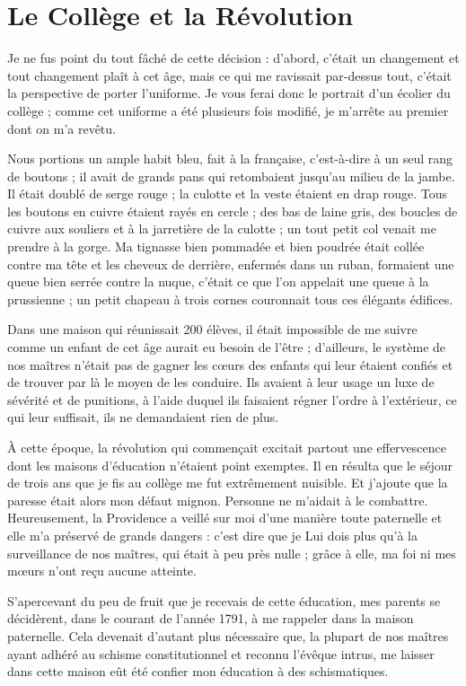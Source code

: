 \documentclass[11pt,a4paper]{report}
\begin{document}
\section*{Le Collège et la Révolution}

Je ne fus point du tout fâché de cette décision : d'abord, c'était un changement et tout changement plaît à cet âge, mais ce qui me ravissait par-dessus tout, c'était la perspective de porter l'uniforme. Je vous ferai donc le portrait d'un écolier du collège ; comme cet uniforme a été plusieurs fois modifié, je m'arrête au premier dont on m'a revêtu.

Nous portions un ample habit bleu, fait à la française, c'est-à-dire à un seul rang de boutons ; il avait de grands pans qui retombaient jusqu'au milieu de la jambe. Il était doublé de serge rouge ; la culotte et la veste étaient en drap rouge. Tous les boutons en cuivre étaient rayés en cercle ; des bas de laine gris, des boucles de cuivre aux souliers et à la jarretière de la culotte ; un tout petit col venait me prendre à la gorge. Ma tignasse bien pommadée et bien poudrée était collée contre ma tête et les cheveux de derrière, enfermés dans un ruban, formaient une queue bien serrée contre la nuque, c'était ce que l'on appelait une queue à la prussienne ; un petit chapeau à trois cornes couronnait tous ces élégants édifices.

Dans une maison qui réunissait 200 élèves, il était impossible de me suivre comme un enfant de cet âge aurait eu besoin de l'être ; d'ailleurs, le système de nos maîtres n'était pas de gagner les cœurs des enfants qui leur étaient confiés et de trouver par là le moyen de les conduire. Ils avaient à leur usage un luxe de sévérité et de punitions, à l'aide duquel ils faisaient régner l'ordre à l'extérieur, ce qui leur suffisait, ils ne demandaient rien de plus.

À cette époque, la révolution qui commençait excitait partout une effervescence dont les maisons d'éducation n'étaient point exemptes. Il en résulta que le séjour de trois ans que je fis au collège me fut extrêmement nuisible. Et j'ajoute que la paresse était alors mon défaut mignon. Personne ne m'aidait à le combattre. Heureusement, la Providence a veillé sur moi d'une manière toute paternelle et elle m'a préservé de grands dangers : c'est dire que je Lui dois plus qu'à la surveillance de nos maîtres, qui était à peu près nulle ; grâce à elle, ma foi ni mes mœurs n'ont reçu aucune atteinte.

S'apercevant du peu de fruit que je recevais de cette éducation, mes parents se décidèrent, dans le courant de l'année 1791, à me rappeler dans la maison paternelle. Cela devenait d'autant plus nécessaire que, la plupart de nos maîtres ayant adhéré au schisme constitutionnel et reconnu l'évêque intrus, me laisser dans cette maison eût été confier mon éducation à des schismatiques.
\end{document}
